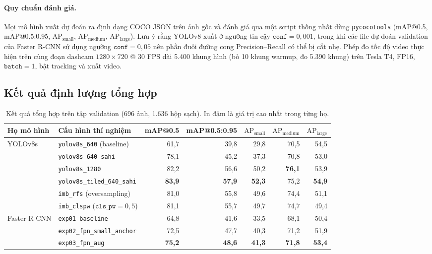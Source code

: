 \documentclass[11pt]{article}
\begin{document}
\paragraph{Quy chuẩn đánh giá.}
Mọi mô hình xuất dự đoán ra định dạng COCO JSON trên ảnh gốc và đánh giá qua một script thống nhất dùng \texttt{pycocotools} (mAP@0.5, mAP@0.5:0.95, $\text{AP}_{\text{small}}$, $\text{AP}_{\text{medium}}$, $\text{AP}_{\text{large}}$). Lưu ý rằng YOLOv8 xuất ở ngưỡng tin cậy $\texttt{conf}=0{,}001$, trong khi các file dự đoán validation của Faster R-CNN sử dụng ngưỡng $\texttt{conf}=0{,}05$ nên phần đuôi đường cong Precision--Recall có thể bị cắt nhẹ. Phép đo tốc độ video thực hiện trên cùng đoạn dashcam $1280 \times 720$ @ 30 FPS dài 5.400 khung hình (bỏ 10 khung warmup, đo 5.390 khung) trên Tesla T4, FP16, $\texttt{batch}=1$, bật tracking và xuất video.

\subsection{Kết quả định lượng tổng hợp}

\begin{table}[t]
\centering
\small
\begin{tabular}{llrrrrr}
\toprule
\textbf{Họ mô hình} & \textbf{Cấu hình thí nghiệm} & \textbf{mAP@0.5} & \textbf{mAP@0.5:0.95} & \textbf{$\text{AP}_{\text{small}}$} & \textbf{$\text{AP}_{\text{medium}}$} & \textbf{$\text{AP}_{\text{large}}$} \\
\midrule
\multirow{6}{*}{YOLOv8s}
 & \texttt{yolov8s\_640} (baseline)        & 61,7 & 39,8 & 29,8 & 70,5 & 54,5 \\
 & \texttt{yolov8s\_640\_sahi}            & 78,1 & 45,2 & 37,3 & 70,8 & 53,0 \\
 & \texttt{yolov8s\_1280}                  & 82,2 & 56,6 & 50,2 & \textbf{76,1} & 53,9 \\
 & \texttt{yolov8s\_tiled\_640\_sahi}     & \textbf{83,9} & \textbf{57,9} & \textbf{52,3} & 75,2 & \textbf{54,9} \\
 & \texttt{imb\_rfs} (oversampling)        & 81,0 & 55,8 & 49,6 & 74,4 & 51,1 \\
 & \texttt{imb\_clspw} ($\texttt{cls\_pw}=0{,}5$) & 81,1 & 55,7 & 49,7 & 74,7 & 49,4 \\
\midrule
\multirow{3}{*}{Faster R-CNN}
 & \texttt{exp01\_baseline}                & 64,8 & 41,6 & 33,5 & 68,1 & 50,4 \\
 & \texttt{exp02\_fpn\_small\_anchor}      & 72,5 & 47,7 & 40,3 & 71,2 & 51,9 \\
 & \texttt{exp03\_fpn\_aug}                & \textbf{75,2} & \textbf{48,6} & \textbf{41,3} & \textbf{71,8} & \textbf{53,4} \\
\bottomrule
\end{tabular}
\caption{Kết quả tổng hợp trên tập validation (696 ảnh, 1.636 hộp sạch). In đậm là giá trị cao nhất trong từng họ.}
\label{tab:val_results}
\end{table}
\end{document}
